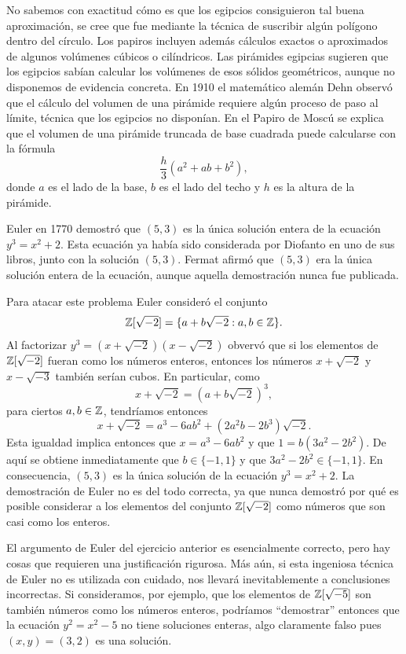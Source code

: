 No sabemos con exactitud cómo es que los egipcios consiguieron tal buena
aproximación, se cree que fue mediante la técnica de suscribir algún polígono
dentro del círculo.  Los papiros incluyen además cálculos exactos o aproximados
de algunos volúmenes cúbicos o cilíndricos.  Las pirámides egipcias sugieren
que los egipcios sabían calcular los volúmenes de esos sólidos geométricos,
aunque no disponemos de evidencia concreta. En 1910 el matemático alemán Dehn
observó que el cálculo del volumen de una pirámide requiere algún proceso de
paso al límite, técnica que los egipcios no disponían.  En el Papiro de Moscú
se explica que el volumen de una pirámide truncada de base cuadrada puede
calcularse con la fórmula
\[
	\frac{h}{3}(a^2+ab+b^2),
\]
donde $a$ es el lado de la base, $b$ es el lado del techo y $h$ es la altura de
la pirámide. 

\begin{example}
	Euler en 1770 demostró que $(5,3)$ es la única solución entera de la
	ecuación $y^3=x^2+2$. Esta ecuación ya había sido considerada por Diofanto
	en uno de sus libros, junto con la solución $(5,3)$. Fermat afirmó que
	$(5,3)$ era la única solución entera de la ecuación, aunque aquella
	demostración nunca fue publicada. 

	Para atacar este problema Euler consideró el conjunto
	\[
		\mathbb{Z}[\sqrt{-2}]=\{a+b\sqrt{-2}:a,b\in\mathbb{Z}\}.
	\]
	Al factorizar $y^3=(x+\sqrt{-2})(x-\sqrt{-2})$ obvervó que si los elementos
	de $\mathbb{Z}[\sqrt{-2}]$ fueran como los números enteros, entonces los números
	$x+\sqrt{-2}$ y $x-\sqrt{-3}$ también serían cubos. En particular, como
	\[
		x+\sqrt{-2}=(a+b\sqrt{-2})^3,
	\]
	para ciertos $a,b\in\mathbb{Z}$, tendríamos entonces
	\[
		x+\sqrt{-2}=a^3-6ab^2+(2a^2b-2b^3)\sqrt{-2}.
	\]
	Esta igualdad implica entonces que $x=a^3-6ab^2$ y que $1=b(3a^2-2b^2)$. 
	De aquí se obtiene inmediatamente que $b\in\{-1,1\}$ y que $3a^2-2b^2\in\{-1,1\}$. 
	En consecuencia, $(5,3)$ es la única solución de la
	ecuación $y^3=x^2+2$. La demostración de Euler no es del todo correcta, ya
	que nunca demostró por qué es posible considerar a los elementos del
	conjunto $\mathbb{Z}[\sqrt{-2}]$ como números que son casi como los enteros.
\end{example}

El argumento de Euler del ejercicio anterior es esencialmente correcto, pero
hay cosas que requieren una justificación rigurosa.  Más aún, si esta ingeniosa
técnica de Euler no es utilizada con cuidado, nos llevará inevitablemente a
conclusiones incorrectas. Si consideramos, por ejemplo, que los elementos de
$\mathbb{Z}[\sqrt{-5}]$ son también números como los números enteros, podríamos
``demostrar'' entonces que la ecuación $y^2=x^2-5$ no tiene soluciones enteras,
algo claramente falso pues $(x,y)=(3,2)$ es una solución.  


